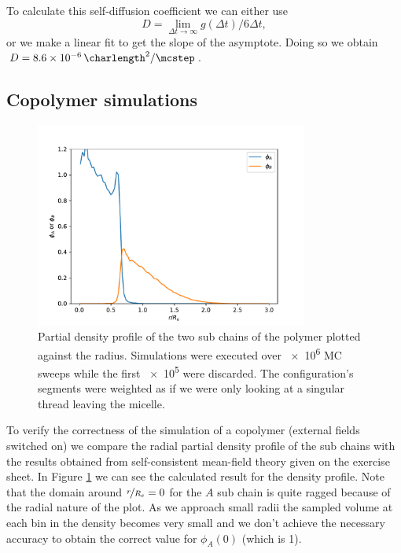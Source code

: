 \documentclass[../main.tex]{subfiles}
\begin{document}
To calculate this self-diffusion coefficient we can either use 
\[
    D = \lim\limits_{\Delta t \to \infty} g(\Delta t)/6\Delta t
,\] 
or we make a linear fit to get the slope of the asymptote.
Doing so we obtain $D = \SI{8.6e-6}{\charlength\squared\per\mcstep}$.


\subsection{Copolymer simulations}

\begin{figure}[htpb]
    \centering
    \includegraphics[width=0.8\textwidth]{../figures/ex1_partial_density_profile.pdf}
    \caption{
        Partial density profile of the two sub chains of the polymer plotted against the radius.
        Simulations were executed over \num{e6} MC sweeps while the first \num{e5} were discarded.
        The configuration's segments were weighted as if we were only looking at a singular thread leaving the micelle.  
    }
    \label{fig:ex1_partial_density_profile}
\end{figure}

To verify the correctness of the simulation of a copolymer (external fields switched on) we compare the radial partial density profile of the sub chains with the results obtained from self-consistent mean-field theory given on the exercise sheet.
In Figure \ref{fig:ex1_partial_density_profile} we can see the calculated result for the density profile.
Note that the domain around $\nicefrac{r}{R_e} = 0$ for the $A$ sub chain is quite ragged because of the radial nature of the plot.
As we approach small radii the sampled volume at each bin in the density becomes very small and we don't achieve the necessary accuracy to obtain the correct value for $\phi_A(0)$ (which is 1).
\par
\end{document}
